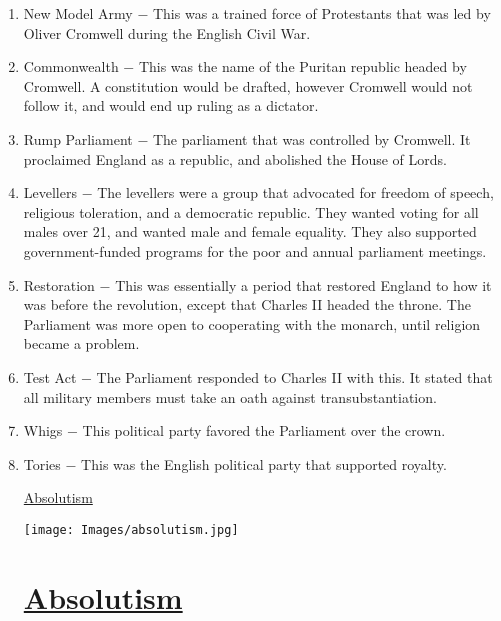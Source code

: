 \documentclass[12pt]{article}
\begin{document}
\begin{enumerate}
\item New Model Army $-$ This was a trained force of Protestants that was led by Oliver Cromwell during the English Civil War.

\item Commonwealth $-$ This was the name of the Puritan republic headed by Cromwell. A constitution would be drafted, however Cromwell would not follow it, and would end up ruling as a dictator.

\item Rump Parliament $-$ The parliament that was controlled by Cromwell. It proclaimed England as a republic, and abolished the House of Lords.

\item Levellers $-$ The levellers were a group that advocated for freedom of speech, religious toleration, and a democratic republic. They wanted voting for all males over 21, and wanted male and female equality. They also supported government-funded programs for the poor and annual parliament meetings.

\item Restoration $-$ This was essentially a period that restored England to how it was before the revolution, except that Charles II headed the throne. The Parliament was more open to cooperating with the monarch, until religion became a problem.

\item Test Act $-$ The Parliament responded to Charles II with this. It stated that all military members must take an oath against transubstantiation.

\item Whigs $-$ This political party favored the Parliament over the crown.

\item Tories $-$ This was the English political party that supported royalty.

\newpage
\begin{center}
\end{center}
\begin{center}
\end{center}
\begin{center}
\underline{\Huge Absolutism}
\end{center}
\vspace{50pt}
\texttt{[image: Images/absolutism.jpg]}
\newpage

\section{\underline{Absolutism}}


\end{enumerate}
\end{document}
